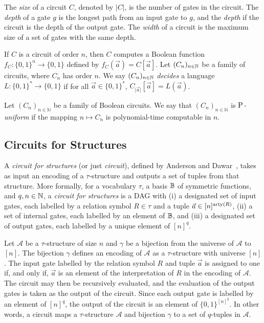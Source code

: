 \documentclass[../paper.tex]{subfiles}
\begin{document}
The \emph{size} of a circuit $C$, denoted by $\vert C \vert$, is the number of
gates in the circuit. The \emph{depth} of a gate $g$ is the longest path from an
input gate to $g$, and the \emph{depth} if the circuit is the depth of the
output gate. The \emph{width} of a circuit is the maximum size of a set of gates
with the same depth.

If $C$ is a circuit of order $n$, then $C$ computes a Boolean function $f_C :
\{0,1\}^n \rightarrow \{0,1\}$ defined by $f_C(\vec{a}) = C[\vec{a}]$. Let
$(C_n)_{n \in \mathbb{N}}$ be a family of circuits, where $C_n$ has order $n$. We say
$(C_n)_{n \in \mathbb{N}}$ \emph{decides} a language $L : \{0,1\}^{*} \rightarrow
\{0,1\}$ if for all $\vec{a} \in \{0,1\}^{*}$, $C_{\vert \vec{a} \vert}
[\vec{a}] = L(\vec{a})$.


\begin{definition}
  Let $(C_n)_{n \in \mathbb{N}}$ be a family of Boolean circuits. We say that
  $(C_n)_{n \in \mathbb{N}}$ is \emph{$\mathrm{P}$-uniform} if the mapping $n \mapsto
  C_n$ is polynomial-time computable in $n$.
\end{definition}

\subsection{Circuits for Structures}
A \emph{circuit for structures} (or just \emph{circuit}), defined by Anderson
and Dawar~\cite{AndersonD17}, takes as input an encoding of a $\tau$-structure
and outputs a set of tuples from that structure. More formally, for a vocabulary
$\tau$, a basis $\mathbb{B}$ of symmetric functions, and $q, n \in \mathbb{N}$, a
\emph{circuit for structures} is a DAG with (i) a designated set of input gates,
each labelled by a relation symbol $R \in \tau$ and a tuple $\vec{a} \in
[n]^{\mathrm{arty}(R)}$, (ii) a set of internal gates, each labelled by an element of
$\mathbb{B}$, and (iii) a designated set of output gates, each labelled by a unique
element of $[n]^q$.

Let $\mathcal{A}$ be a $\tau$-structure of size $n$ and $\gamma$ be a bijection
from the universe of $\mathcal{A}$ to $[n]$. The bijection $\gamma$ defines an
encoding of $\mathcal{A}$ as a $\tau$-structure with universe $[n]$. The input
gate labelled by the relation symbol $R$ and tuple $\vec{a}$ is assigned to one
if, and only if, $\vec{a}$ is an element of the interpretation of $R$ in the
encoding of $\mathcal{A}$. The circuit may then be recursively evaluated, and
the evaluation of the output gates is taken as the output of the circuit. Since
each output gate is labelled by an element of $[n]^q$, the output of the circuit
is an element of $\{0,1\}^{[n]^q}$. In other words, a circuit maps a
$\tau$-structure $\mathcal{A}$ and bijection $\gamma$ to a set of $q$-tuples in
$\mathcal{A}$.
\end{document}
